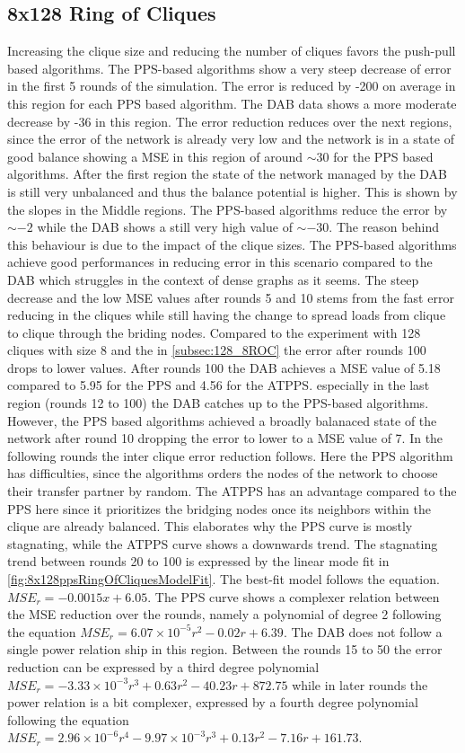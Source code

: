 \subsection{8x128 Ring of Cliques}\label{subsec:8_128ROC}
Increasing the clique size and reducing the number of cliques favors the push-pull based algorithms. The PPS-based algorithms show a very steep decrease of error in the first 5 rounds of the simulation. The error is reduced by -200 on average in this region for each PPS based algorithm. The DAB data shows a more moderate decrease by -36 in this region. The error reduction reduces over the next regions, since the error of the network is already very low and the network is in a state of good balance showing a MSE in this region of around $\sim 30$ for the PPS based algorithms. After the first region the state of the network managed by the DAB is still very unbalanced and thus the balance potential is higher. This is shown by the slopes in the Middle regions. The PPS-based algorithms reduce the error by $\sim -2$ while the DAB shows a still very high value of $\sim -30$. The reason behind this behaviour is due to the impact of the clique sizes. The PPS-based algorithms achieve good performances in reducing error in this scenario compared to the DAB which struggles in the context of dense graphs as it seems. The steep decrease and the low MSE values after rounds 5 and 10 stems from the fast error reducing in the cliques while still having the change to spread loads from clique to clique through the briding nodes. Compared to the experiment with 128 cliques with size 8 and the in \ref{subsec:128_8ROC} the error after rounds 100 drops to lower values. After rounds 100 the DAB achieves a MSE value of 5.18 compared to 5.95 for the PPS and 4.56 for the ATPPS. especially in the last region (rounds 12 to 100) the DAB catches up to the PPS-based algorithms. However, the PPS based algorithms achieved a broadly balanaced state of the network after round 10 dropping the error to lower to a MSE value of 7. In the following rounds the inter clique error reduction follows. Here the PPS algorithm has difficulties, since the algorithms orders the nodes of the network to choose their transfer partner by random. The ATPPS has an advantage compared to the PPS here since it prioritizes the bridging nodes once its neighbors within the clique are already balanced. This elaborates why the PPS curve is mostly stagnating, while the ATPPS curve shows a downwards trend. The stagnating trend between rounds 20 to 100 is expressed by the linear mode fit in \ref{fig:8x128ppsRingOfCliquesModelFit}. The best-fit model follows the equation. $MSE_r=-0.0015x+6.05$. The PPS curve shows a complexer relation between the MSE reduction over the rounds, namely a polynomial of degree 2 following the equation $MSE_r=6.07\times 10^{-5}r^{2}-0.02r+6.39$. The DAB does not follow a single power relation ship in this region. Between the rounds 15 to 50 the error reduction can be expressed by a third degree polynomial $MSE_r=-3.33\times 10^{-3}r^{3}+0.63r^{2}-40.23r+872.75$ while in later rounds the power relation is a bit complexer, expressed by a fourth degree polynomial following the equation $MSE_r=2.96 \times 10^{-6}r^{4}-9.97\times 10^{-3}r^{3}+0.13r^{2}-7.16r+161.73$.

